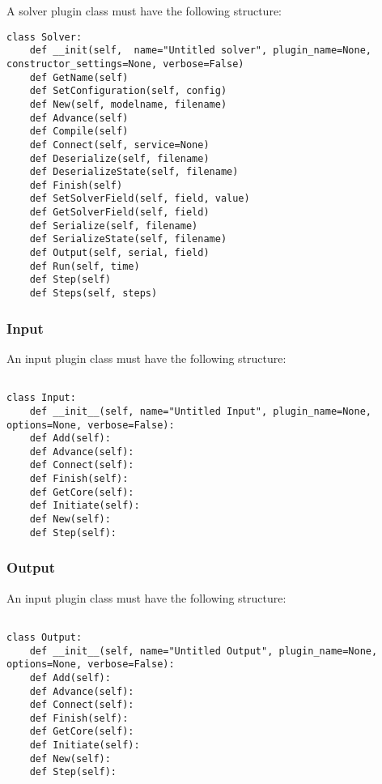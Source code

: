 \documentclass[12pt]{article}
\begin{document}
A solver plugin class must have the following structure:

\begin{verbatim}
class Solver:
	def __init(self,  name="Untitled solver", plugin_name=None, constructor_settings=None, verbose=False)
	def GetName(self)
	def SetConfiguration(self, config)
	def New(self, modelname, filename)
	def Advance(self)
	def Compile(self)
	def Connect(self, service=None)
	def Deserialize(self, filename)
	def DeserializeState(self, filename)
	def Finish(self)
	def SetSolverField(self, field, value)
	def GetSolverField(self, field)
	def Serialize(self, filename)
	def SerializeState(self, filename)
	def Output(self, serial, field)
	def Run(self, time)
	def Step(self)
	def Steps(self, steps)
\end{verbatim}


\subsubsection*{Input}

An input plugin class must have the following structure:

\begin{verbatim}

class Input:
    def __init__(self, name="Untitled Input", plugin_name=None, options=None, verbose=False):
    def Add(self):
    def Advance(self):
    def Connect(self):
    def Finish(self):
    def GetCore(self):
    def Initiate(self):
    def New(self):
    def Step(self):
\end{verbatim}


\subsubsection*{Output}

An input plugin class must have the following structure:

\begin{verbatim}

class Output:
    def __init__(self, name="Untitled Output", plugin_name=None, options=None, verbose=False):
    def Add(self):
    def Advance(self):
    def Connect(self):
    def Finish(self):
    def GetCore(self):
    def Initiate(self):
    def New(self):
    def Step(self):
\end{verbatim}




\subsection*{}
\end{document}
